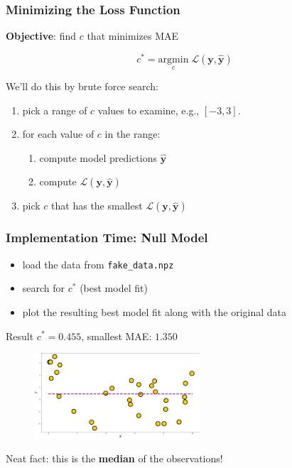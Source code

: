 \documentclass{beamer}
\begin{document}
\begin{frame}
\frametitle{Minimizing the Loss Function}

\textbf{Objective}: find $c$ that minimizes MAE

\[
c^{*}=\underset{c}{\textrm{argmin}}\;\mathcal{L}(\mathbf{y},\hat{\mathbf{y}})
\]

We'll do this by brute force search:

\begin{enumerate}
\item pick a range of $c$ values to examine, e.g., $[-3, 3]$.
\item for each value of $c$ in the range:

\begin{enumerate}
\item compute model predictions $\hat{\mathbf{y}}$
\item compute $\mathcal{L}(\mathbf{y}, \hat{\mathbf{y}})$
\end{enumerate}

\item pick $c$ that has the smallest $\mathcal{L}(\mathbf{y}, \hat{\mathbf{y}})$

\end{enumerate}

\end{frame}

\begin{frame}
\frametitle{Implementation Time: Null Model}

\begin{itemize}
\item load the data from \texttt{fake\_data.npz} 
\item search for $c^*$ (best model fit)
\item plot the resulting best model fit along with the original data
\end{itemize}

\begin{exampleblock}{Result}
$c^* = 0.455$, smallest MAE: $1.350$
 \end{exampleblock}

\begin{figure}
\includegraphics[width=0.55\textwidth]{../figures/best_null.png}
\end{figure}

\alert{Neat fact}: this is the \textbf{median} of the observations!

\end{frame}
\end{document}
